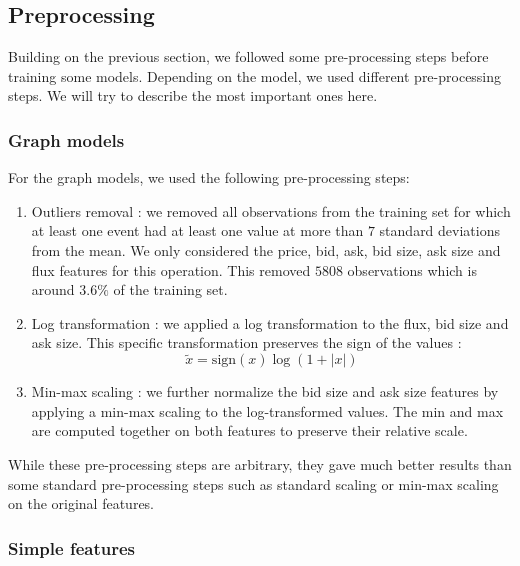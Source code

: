 \documentclass[switch, 11pt]{article}
\begin{document}
\begin{multicols}{2}
    \subsection{Preprocessing}

    Building on the previous section, we followed some pre-processing steps before training some models. Depending on the model, we used different pre-processing steps. We will try to describe the most important ones here.

    \subsubsection{Graph models}

    For the graph models, we used the following pre-processing steps:
    \begin{enumerate}
        \item Outliers removal : we removed all observations from the training set for which at least one event had at least one value at more than $7$ standard deviations from the mean. We only considered the price, bid, ask, bid size, ask size and flux features for this operation. This removed $5808$ observations which is around $3.6\%$ of the training set.
        \item Log transformation : we applied a log transformation to the flux, bid size and ask size. This specific transformation preserves the sign of the values :
              $$\tilde{x}= \text{sign}(x)\log(1+|x|)$$
        \item Min-max scaling : we further normalize the bid size and ask size features by applying a min-max scaling to the log-transformed values. The min and max are computed together on both features to preserve their relative scale.
    \end{enumerate}

    While these pre-processing steps are arbitrary, they gave much better results than some standard pre-processing steps such as standard scaling or min-max scaling on the original features.

    \subsubsection{Simple features}


\end{multicols}
\end{document}

